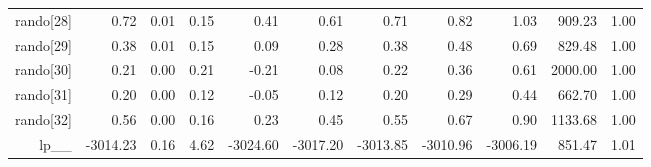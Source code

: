 \begin{table}[ht]
\begin{tabular}{rrrrrrrrrrr}
  rando[28] & 0.72 & 0.01 & 0.15 & 0.41 & 0.61 & 0.71 & 0.82 & 1.03 & 909.23 & 1.00 \\ 
  rando[29] & 0.38 & 0.01 & 0.15 & 0.09 & 0.28 & 0.38 & 0.48 & 0.69 & 829.48 & 1.00 \\ 
  rando[30] & 0.21 & 0.00 & 0.21 & -0.21 & 0.08 & 0.22 & 0.36 & 0.61 & 2000.00 & 1.00 \\ 
  rando[31] & 0.20 & 0.00 & 0.12 & -0.05 & 0.12 & 0.20 & 0.29 & 0.44 & 662.70 & 1.00 \\ 
  rando[32] & 0.56 & 0.00 & 0.16 & 0.23 & 0.45 & 0.55 & 0.67 & 0.90 & 1133.68 & 1.00 \\ 
  lp\_\_ & -3014.23 & 0.16 & 4.62 & -3024.60 & -3017.20 & -3013.85 & -3010.96 & -3006.19 & 851.47 & 1.01 \\ 
   \hline
\end{tabular}
\label{scalefit_tab}
\end{table}

